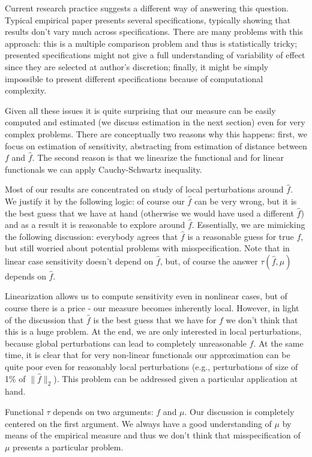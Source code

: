 \documentclass[12pt]{article}
\theoremstyle{plain}
\begin{document}
Current research practice suggests a different way of answering this question. Typical empirical paper presents several specifications, typically showing that results don't vary much across specifications. There are many problems with this approach: this is a multiple comparison problem and thus is statistically tricky; presented specifications might not give a full understanding of variability of effect since they are selected at author's discretion; finally, it might be simply impossible to present different specifications because of computational complexity. 

Given all these issues it is quite surprising that our measure can be easily computed and estimated (we discuss estimation in the next section) even for very complex problems. There are conceptually two reasons why this happens: first, we focus on estimation of sensitivity, abstracting from estimation of distance between $f$ and $\hat f$. The second reason is that we linearize the functional and for linear functionals we can apply Cauchy-Schwartz inequality. 

Most of our results are concentrated on study of local perturbations around $\hat f$. We justify it by the following logic: of course our $\hat f$ can be very wrong, but it is the best guess that we have at hand (otherwise we would have used a different $\hat f$) and as a result it is reasonable to explore around $\hat f$. Essentially, we are mimicking the following discussion: everybody agrees that $\hat f$ is a reasonable guess for true $f$, but still worried about potential problems with misspecification. Note that in linear case sensitivity doesn't depend on $\hat f$, but, of course the answer $\tau(\hat f, \mu)$ depends on $\hat f$.

Linearization allows us to compute sensitivity even in nonlinear cases, but of course there is a price - our measure becomes inherently local. However, in light of the discussion that $\hat f$ is the best guess that we have for $f$ we don't think that this is a huge problem. At the end, we are only interested in local perturbations, because global perturbations can lead to completely unreasonable $f$. At the same time, it is clear that for very non-linear functionals our approximation can be quite poor even for reasonably local perturbations (e.g., perturbations of size of 1\% of $\|\hat f\|_2$). This problem can be addressed given a particular application at hand.

Functional $\tau$ depends on two arguments: $f$ and $\mu$. Our discussion is completely centered on the first argument. We always have a good understanding of $\mu$ by means of the empirical measure and thus we don't think that misspecification of $\mu$ presents a particular problem. 
\end{document}
